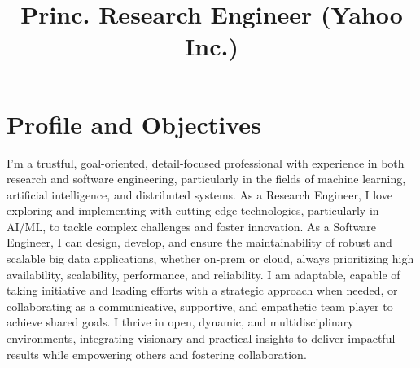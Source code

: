 \documentclass[10pt,a4paper,english]{moderncv}      %
\title{Princ. Research Engineer (Yahoo Inc.)}               %
\begin{document}
\maketitle
\vspace{-1cm}

\section{Profile and Objectives}
\small I’m a trustful, goal-oriented, detail-focused professional with experience in both research and 
software engineering, particularly in the fields of machine learning, artificial intelligence, and 
distributed systems. As a Research Engineer, I love exploring and implementing with cutting-edge technologies, 
particularly in AI/ML, to tackle complex challenges and foster innovation. As a Software Engineer, I can design, 
develop, and ensure the maintainability of robust and scalable big data applications, whether on-prem or 
cloud, always prioritizing high availability, scalability, performance, and reliability. I am adaptable, 
capable of taking initiative and leading efforts with a strategic approach when needed, or collaborating 
as a communicative, supportive, and empathetic team player to achieve shared goals. I thrive in open, 
dynamic, and multidisciplinary environments, integrating visionary and practical insights to deliver 
impactful results while empowering others and fostering collaboration.

\end{document}

